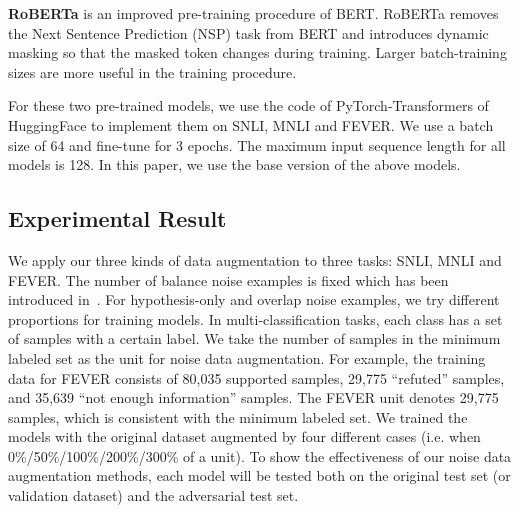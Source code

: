 \textbf{RoBERTa} is an improved pre-training procedure of BERT. 
RoBERTa removes the Next Sentence Prediction (NSP) task from 
BERT and introduces dynamic masking so that the 
masked token changes during training. 
Larger batch-training sizes are more useful in the training procedure.

For these two pre-trained models, we use the code of PyTorch-Transformers of HuggingFace to implement them on SNLI, MNLI and FEVER. We use a batch size of 64 and fine-tune for 3 epochs. The maximum input sequence length for all
models is 128. In this paper, we use the base version of the above models. 

\subsection{Experimental Result}
We apply our three kinds of data augmentation to three tasks: SNLI, MNLI and FEVER. 
The number of balance noise examples
is fixed which has been introduced in~. 
For hypothesis-only and overlap noise examples, 
we try different proportions for training models. 
In multi-classification tasks, each class has a set of samples with a certain label. 
We take the number of samples in the minimum labeled set 
as the unit for noise data augmentation. 
For example, the training data for FEVER consists of 80,035 supported samples, 29,775 ``refuted'' samples, 
and 35,639 ``not enough information'' samples. 
The FEVER unit denotes 29,775 samples, which is consistent with the minimum labeled set.
We trained the models with the original dataset augmented by four different cases (i.e. when
0\%/50\%/100\%/200\%/300\% of a unit).
To show the effectiveness of our noise data augmentation methods, 
each model will be tested both on the original test set (or validation 
dataset) and the adversarial test set. 



